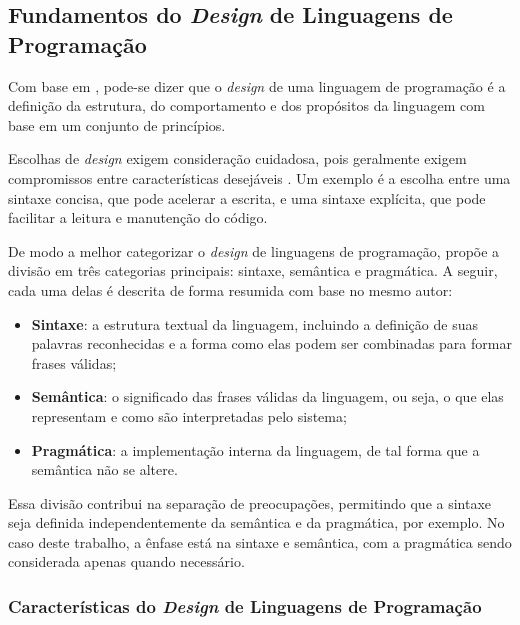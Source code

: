 \subsection{Fundamentos do \textit{Design} de Linguagens de Programação}
\label{sec:design_linguagem}

Com base em \cite{conceptsoflanguages}, pode-se dizer que o \textit{design} de uma linguagem de programação é a definição da estrutura, do comportamento e dos propósitos da linguagem com base em um conjunto de princípios.

Escolhas de \textit{design} exigem consideração cuidadosa, pois geralmente exigem compromissos entre características desejáveis \cite{conceptsoflanguages}. Um exemplo é a escolha entre uma sintaxe concisa, que pode acelerar a escrita, e uma sintaxe explícita, que pode facilitar a leitura e manutenção do código.

De modo a melhor categorizar o \textit{design} de linguagens de programação,  propõe a divisão em três categorias principais: sintaxe, semântica e pragmática. A seguir, cada uma delas é descrita de forma resumida com base no mesmo autor:

\begin{itemize}
	\item \textbf{Sintaxe}: a estrutura textual da linguagem, incluindo a definição de suas palavras reconhecidas e a forma como elas podem ser combinadas para formar frases válidas;

	\item \textbf{Semântica}: o significado das frases válidas da linguagem, ou seja, o que elas representam e como são interpretadas pelo sistema;

	\item \textbf{Pragmática}: a implementação interna da linguagem, de tal forma que a semântica não se altere.
\end{itemize}

Essa divisão contribui na separação de preocupações, permitindo que a sintaxe seja definida independentemente da semântica e da pragmática, por exemplo. No caso deste trabalho, a ênfase está na sintaxe e semântica, com a pragmática sendo considerada apenas quando necessário.

\subsubsection{Características do \textit{Design} de Linguagens de Programação}


